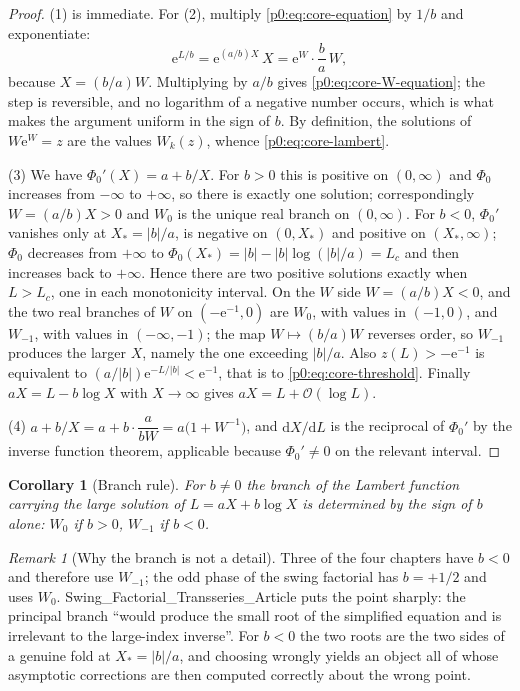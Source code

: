 \documentclass[11pt,a4paper,oneside]{book}
\theoremstyle{plain}
\newtheorem{corollary}[theorem]{Corollary}
\theoremstyle{definition}
\theoremstyle{remark}
\newtheorem{remark}[theorem]{Remark}
\newcommand{\e}{\mathrm{e}}
\newcommand{\dd}{\mathrm{d}}
\newcommand{\bigO}{\mathcal{O}}
\newcommand{\Wlam}{W}
\begin{document}
\begin{proof}
(1) is immediate.  For (2), multiply \eqref{p0:eq:core-equation} by $1/b$ and
exponentiate:
\[
 \e^{L/b}=\e^{(a/b)X}\,X=\e^{W}\cdot\frac ba\,W ,
\]
because $X=(b/a)W$.  Multiplying by $a/b$ gives
\eqref{p0:eq:core-W-equation}; the step is reversible, and no logarithm of a
negative number occurs, which is what makes the argument uniform in the sign of
$b$.  By definition, the solutions of $W\e^{W}=z$ are the values $\Wlam_k(z)$,
whence \eqref{p0:eq:core-lambert}.

(3) We have $\Phi_0'(X)=a+b/X$.  For $b>0$ this is positive on $(0,\infty)$
and $\Phi_0$ increases from $-\infty$ to $+\infty$, so there is exactly one
solution; correspondingly $W=(a/b)X>0$ and $\Wlam_0$ is the unique real branch
on $(0,\infty)$.  For $b<0$, $\Phi_0'$ vanishes only at $X_\ast=|b|/a$, is
negative on $(0,X_\ast)$ and positive on $(X_\ast,\infty)$; $\Phi_0$ decreases
from $+\infty$ to $\Phi_0(X_\ast)=|b|-|b|\log(|b|/a)=L_c$ and then increases
back to $+\infty$.  Hence there are two positive solutions exactly when
$L>L_c$, one in each monotonicity interval.  On the $W$ side $W=(a/b)X<0$, and
the two real branches of $\Wlam$ on $(-\e^{-1},0)$ are $\Wlam_0$, with values
in $(-1,0)$, and $\Wlam_{-1}$, with values in $(-\infty,-1)$; the map
$W\mapsto(b/a)W$ reverses order, so $\Wlam_{-1}$ produces the larger $X$,
namely the one exceeding $|b|/a$.  Also $z(L)>-\e^{-1}$ is equivalent to
$(a/|b|)\e^{-L/|b|}<\e^{-1}$, that is to \eqref{p0:eq:core-threshold}.
Finally $aX=L-b\log X$ with $X\to\infty$ gives $aX=L+\bigO(\log L)$.

(4) $a+b/X=a+b\cdot\dfrac{a}{bW}=a\bigl(1+W^{-1}\bigr)$, and $\dd X/\dd L$ is
the reciprocal of $\Phi_0'$ by the inverse function theorem, applicable
because $\Phi_0'\ne0$ on the relevant interval.
\end{proof}

\begin{corollary}[Branch rule]\label{p0:cor:branch-rule}
For $b\ne0$ the branch of the Lambert function carrying the large solution of
$L=aX+b\log X$ is determined by the sign of $b$ alone: $\Wlam_0$ if $b>0$,
$\Wlam_{-1}$ if $b<0$.
\end{corollary}

\begin{remark}[Why the branch is not a detail]\label{p0:rem:branch}
Three of the four chapters have $b<0$ and therefore use $\Wlam_{-1}$; the odd
phase of the swing factorial has $b=+1/2$ and uses $\Wlam_0$.
\textsf{Swing\_Factorial\_Transseries\_Article} puts the point sharply: the
principal branch ``would produce the small root of the simplified equation and
is irrelevant to the large-index inverse''.  For $b<0$ the two roots are the
two sides of a genuine fold at $X_\ast=|b|/a$, and choosing wrongly yields an
object all of whose asymptotic corrections are then computed correctly about
the wrong point.
\end{remark}
\end{document}
